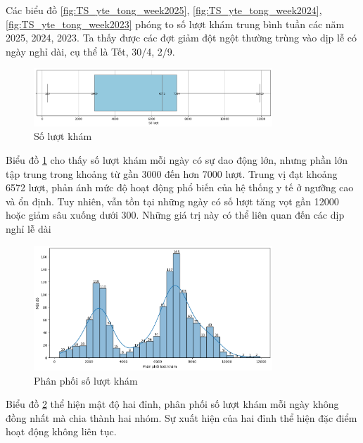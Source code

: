     Các biểu đồ \ref{fig:TS_yte_tong_week2025}, \ref{fig:TS_yte_tong_week2024}, \ref{fig:TS_yte_tong_week2023} phóng to số lượt khám trung bình tuần các năm 2025, 2024, 2023. Ta thấy được các đợt giảm đột ngột thường trùng vào dịp lễ có ngày nghỉ dài, cụ thể là Tết, 30/4, 2/9.

    \begin{figure}[htp]
        \centering
        \includegraphics[width=0.80\textwidth]{images/TS_yte_tong_box.png}
        \caption{Số lượt khám}
        \label{fig:TS_yte_tong_box}
    \end{figure}
    \FloatBarrier

    Biểu đồ \ref{fig:TS_yte_tong_box} cho thấy số lượt khám mỗi ngày có sự dao động lớn, nhưng phần lớn tập trung trong khoảng từ gần 3000 đến hơn 7000 lượt. Trung vị đạt khoảng 6572 lượt, phản ánh mức độ hoạt động phổ biến của hệ thống y tế ở ngưỡng cao và ổn định. Tuy nhiên, vẫn tồn tại những ngày có số lượt tăng vọt gần 12000 hoặc giảm sâu xuống dưới 300. Những giá trị này có thể liên quan đến các dịp nghỉ lễ dài

    \begin{figure}[htp]
        \centering
        \includegraphics[width=0.80\textwidth]{images/TS_yte_tong_hist.png}
        \caption{Phân phối số lượt khám}
        \label{fig:TS_yte_tong_hist}
    \end{figure}
    \FloatBarrier

    Biểu đồ \ref{fig:TS_yte_tong_hist} thể hiện mật độ hai đỉnh, phân phối số lượt khám mỗi ngày không đồng nhất mà chia thành hai nhóm. Sự xuất hiện của hai đỉnh thể hiện đặc điểm hoạt động không liên tục.

